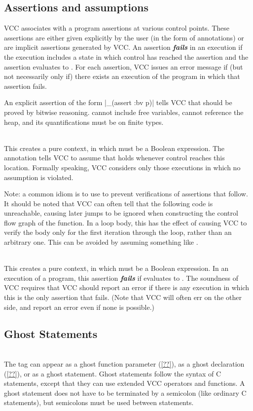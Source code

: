 \documentclass[preprint,nocopyrightspace]{sigplanconf}
\newcommand{\Def}[1]{\textit{\textbf{#1}}}
\begin{document}
{{{\subsection{Assertions and assumptions}
VCC associates with a program assertions at various control
points. These assertions are either given explicitly by the user (in
the form of  annotations) or are implicit assertions
generated by VCC. An assertion \Def{fails} in an execution if the
execution includes a state in which control has reached the assertion
and the assertion evaluates to . For each assertion, VCC issues an
error message if (but not necessarily only if) there exists an
execution of the program in which that assertion fails.

An explicit assertion of the form \vcc|_(assert {:bv} p)|
tells VCC that  should be proved by bitwise reasoning. 
cannot include free variables, cannot reference the heap, and its
quantifications must be on finite types.

\\
This creates a pure context, in which  must be a Boolean
expression. The annotation tells VCC to assume that  holds
whenever control reaches this location. Formally speaking, VCC
considers only those executions in which no assumption is violated.

Note: a common idiom is to use  to prevent
verifications of assertions that follow. It should be noted that VCC
can often tell that the following code is unreachable, causing later
jumps to be ignored when constructing the control flow graph of the
function. In a loop body, this has the effect of causing VCC to verify
the body only for the first iteration through the loop, rather than an
arbitrary one. This can be avoided by assuming something like 
.

\\
This creates a pure context, in which  must be a Boolean
expression. In an execution of a program, this assertion \Def{fails}
if  evaluates to . The soundness of VCC requires that
VCC should report an error if there is any execution in which this is
the only assertion that fails. (Note that VCC will often err on the
other side, and report an error even if none is possible.)

\subsection{Ghost Statements}
\\
The tag  can appear as a ghost function parameter
(\ref{??}), as a ghost declaration (\ref{??}), or as a ghost
statement. Ghost statements follow the syntax of C statements, except
that they can use extended VCC operators and functions. A ghost
statement does not have to be terminated by a semicolon (like ordinary
C statements), but semicolons must be used between statements.

}}}
\end{document}
